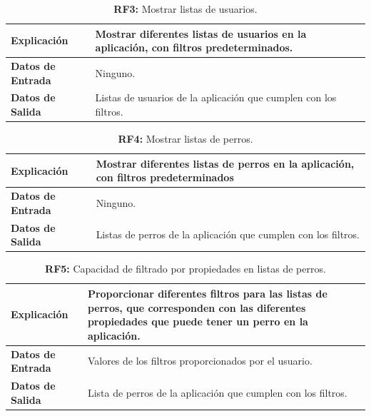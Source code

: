 \documentclass[a4paper, 12pt]{article}
\begin{document}
\begin{table}[H]
\captionsetup{justification=raggedright,singlelinecheck=false}
\caption{\textbf{RF3:} Mostrar listas de usuarios.}
\label{tab:RF23}
	\begin{tabular}{|m{5cm}|m{10cm}|}
	\hline
	\textbf{Explicación} & Mostrar diferentes listas de usuarios en la aplicación, con filtros predeterminados. \\ 
	\hline
	\textbf{Datos de Entrada} & Ninguno. \\ 
	\hline
	\textbf{Datos de Salida} & Listas de usuarios de la aplicación que cumplen con los filtros.  \\ 
	\hline
\end{tabular}
\end{table}

\begin{table}[H]
\captionsetup{justification=raggedright,singlelinecheck=false}
\caption{\textbf{RF4:} Mostrar listas de perros.}
\label{tab:RF4}
	\begin{tabular}{|m{5cm}|m{10cm}|}
	\hline
	\textbf{Explicación} & Mostrar diferentes listas de perros en la aplicación, con filtros predeterminados \\ 
	\hline
	\textbf{Datos de Entrada} & Ninguno. \\ 
	\hline
	\textbf{Datos de Salida} & Listas de perros de la aplicación que cumplen con los filtros. \\ 
	\hline
\end{tabular}
\end{table}

\begin{table}[H]
\captionsetup{justification=raggedright,singlelinecheck=false}
\caption{\textbf{RF5:} Capacidad de filtrado por propiedades en listas de perros.}
\label{tab:RF5}
	\begin{tabular}{|m{5cm}|m{10cm}|}
	\hline
	\textbf{Explicación} & Proporcionar diferentes filtros para las listas de perros, que corresponden con las diferentes propiedades que puede tener un perro en la aplicación. \\ 
	\hline
	\textbf{Datos de Entrada} & Valores de los filtros proporcionados por el usuario. \\ 
	\hline
	\textbf{Datos de Salida} & Lista de perros de la aplicación que cumplen con los filtros. \\ 
	\hline
\end{tabular}
\end{table}
\end{document}
